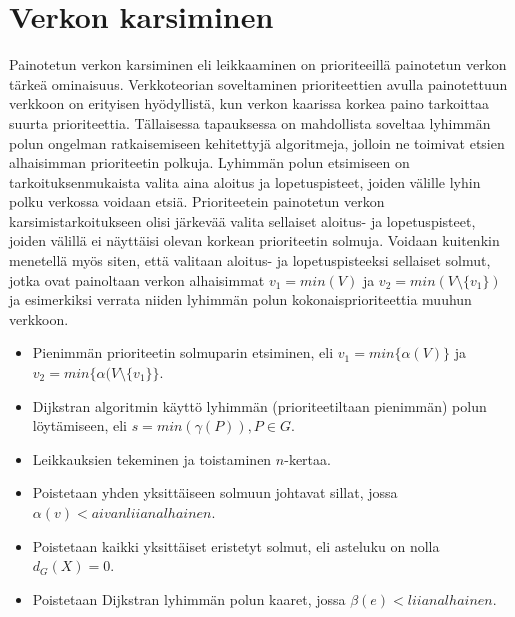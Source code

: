 \section{Verkon karsiminen} \label{ch:10_verkon_karsiminen}

  Painotetun verkon karsiminen eli leikkaaminen on prioriteeillä painotetun verkon tärkeä ominaisuus.
  Verkkoteorian soveltaminen prioriteettien avulla painotettuun verkkoon on erityisen hyödyllistä, kun verkon kaarissa korkea paino tarkoittaa suurta prioriteettia.
  Tällaisessa tapauksessa on mahdollista soveltaa lyhimmän polun ongelman ratkaisemiseen kehitettyjä algoritmeja, jolloin ne toimivat etsien alhaisimman prioriteetin polkuja.
  Lyhimmän polun etsimiseen on tarkoituksenmukaista valita aina aloitus ja lopetuspisteet, joiden välille lyhin polku verkossa voidaan etsiä.
  Prioriteetein painotetun verkon karsimistarkoitukseen olisi järkevää valita sellaiset aloitus- ja lopetuspisteet, joiden välillä ei näyttäisi olevan korkean prioriteetin solmuja.
  Voidaan kuitenkin menetellä myös siten, että valitaan aloitus- ja lopetuspisteeksi sellaiset solmut, jotka ovat painoltaan verkon alhaisimmat \(v_1 = min(V)\) ja \(v_2 = min(V \setminus \{v_1\})\) ja esimerkiksi verrata niiden lyhimmän polun kokonaisprioriteettia muuhun verkkoon.

  \begin{itemize}
    \item Pienimmän prioriteetin solmuparin etsiminen, eli \(v_1 = min\{ \alpha(V) \}\) ja \(v_2 = min\{\alpha( V \setminus \{v_1\} \}\).
    \item Dijkstran algoritmin käyttö lyhimmän (prioriteetiltaan pienimmän) polun löytämiseen, eli \(s = min( \gamma(P) ), P \in G\).
    \item Leikkauksien tekeminen ja toistaminen \(n\)-kertaa.
    \item Poistetaan yhden yksittäiseen solmuun johtavat sillat, jossa \(\alpha(v) < aivan liian alhainen \).
    \item Poistetaan kaikki yksittäiset eristetyt solmut, eli asteluku on nolla \(d_G(X) = 0\).
    \item Poistetaan Dijkstran lyhimmän polun kaaret, jossa \(\beta(e) < liian alhainen \).
  \end{itemize}


